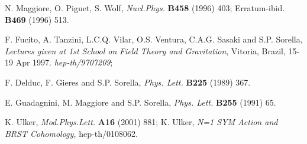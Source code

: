 \documentclass[a4paper,12pt]{article}
\begin{document}
\begin{thebibliography}{99}
  N. Maggiore, O. Piguet, S. Wolf, \emph{Nucl.Phys. }\textbf{%
B458 }(1996) 403; Erratum-ibid. \textbf{B469} (1996) 513.

  F. Fucito, A. Tanzini, L.C.Q. Vilar, O.S. Ventura, C.A.G.
Sasaki and S.P. Sorella, \emph{Lectures given at 1st School on} \emph{Field
Theory and Gravitation}, Vitoria, Brazil, 15-19 Apr 1997. \emph{%
hep-th/9707209};

  F. Delduc, F. Gieres and S.P. Sorella, \emph{Phys. Lett. }%
\textbf{B225 }(1989) 367.

  E. Guadagnini, M. Maggiore and S.P. Sorella, \emph{Phys.
Lett. }\textbf{B255 }(1991) 65.

  K. Ulker, \emph{Mod.Phys.Lett.} \textbf{A16} (2001) 881;%
\newline
K. Ulker, \textit{N=1 SYM Action and BRST Cohomology, }hep-th/0108062.
\end{thebibliography}
\end{document}
